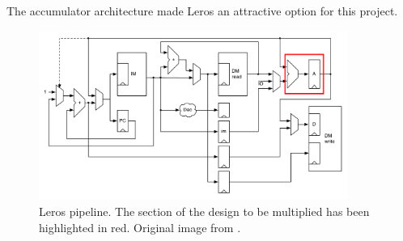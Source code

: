 The accumulator architecture made Leros an attractive option for this project.

\begin{figure}[h]
\center
\includegraphics[width=0.9\textwidth]{images/leros-system}
\caption{Leros pipeline. The section of the design to be multiplied has been
highlighted in red. Original image from \cite{schoeberlleros}.
}
\label{fig:leros-system}
\end{figure}
